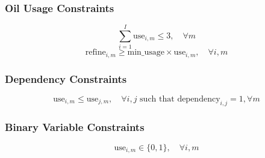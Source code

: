 \documentclass{article}
\begin{document}
\subsubsection*{Oil Usage Constraints}
\[
\sum_{i=1}^{I} \text{use}_{i,m} \leq 3, \quad \forall m 
\]
\[
\text{refine}_{i,m} \geq \text{min\_usage} \times \text{use}_{i,m}, \quad \forall i, m
\]

\subsubsection*{Dependency Constraints}
\[
\text{use}_{i,m} \leq \text{use}_{j,m}, \quad \forall i, j \text{ such that } \text{dependency}_{i,j} = 1, \forall m
\]

\subsubsection*{Binary Variable Constraints}
\[
\text{use}_{i,m} \in \{0, 1\}, \quad \forall i, m
\]
\end{document}
